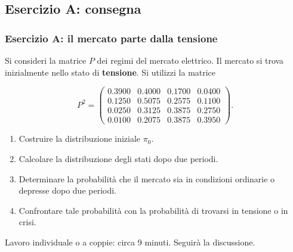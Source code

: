 \subsection{Esercizio A: consegna}%

\begin{frame}%
%

\frametitle{Esercizio A: il mercato parte dalla tensione}%


Si consideri la matrice $P$ dei regimi del mercato elettrico. Il mercato si
trova inizialmente nello stato di \textbf{tensione}. Si utilizzi la matrice%

\[
P^{2} =
\begin{pmatrix}
0.3900 & 0.4000 & 0.1700 & 0.0400\\
0.1250 & 0.5075 & 0.2575 & 0.1100\\
0.0250 & 0.3125 & 0.3875 & 0.2750\\
0.0100 & 0.2075 & 0.3875 & 0.3950
\end{pmatrix}
.
\]


\medskip

\begin{enumerate}
\item[1.] Costruire la distribuzione iniziale $\pi_{0}$.

\item[2.] Calcolare la distribuzione degli stati dopo due periodi.

\item[3.] Determinare la probabilit\`{a} che il mercato sia in condizioni
ordinarie o depresse dopo due periodi.

\item[4.] Confrontare tale probabilit\`{a} con la probabilit\`{a} di trovarsi
in tensione o in crisi.
\end{enumerate}

\medskip

\begin{center}
{\small Lavoro individuale o a coppie: circa 9 minuti. Seguir\`{a} la
discussione.}
\end{center}

%

\transboxout
\end{frame}%


